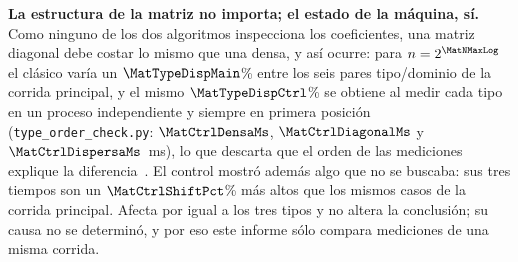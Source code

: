 \textbf{La estructura de la matriz no importa; el estado de la máquina, sí.}
Como ninguno de los dos algoritmos inspecciona los coeficientes, una matriz
diagonal debe costar lo mismo que una densa, y así ocurre: para
$n=2^{\MatNMaxLog}$ el clásico varía un $\MatTypeDispMain$\% entre los seis
pares tipo/dominio de la corrida principal, y el mismo $\MatTypeDispCtrl$\% se
obtiene al medir cada tipo en un proceso independiente y siempre en primera
posición (\texttt{type\_order\_check.py}: $\MatCtrlDensaMs$, $\MatCtrlDiagonalMs$
y $\MatCtrlDispersaMs$~ms), lo que descarta que el orden de las mediciones
explique la diferencia~\cite{mcgeoch2012}. El control mostró además algo que
no se buscaba: sus tres tiempos son un $\MatCtrlShiftPct$\% más altos que los
mismos casos de la corrida principal. Afecta por igual a los tres tipos y no
altera la conclusión; su causa no se determinó, y por eso este informe sólo
compara mediciones de una misma corrida.
